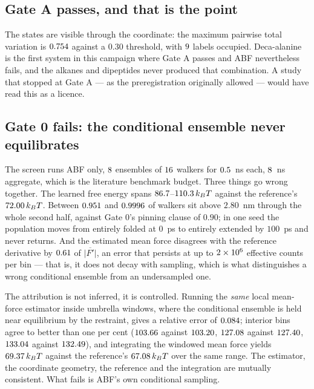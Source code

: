 \subsection{Gate A passes, and that is the point}

The states are visible through the coordinate: the maximum pairwise total variation is
$0.754$ against a $0.30$ threshold, with $9$ labels occupied. Deca-alanine is
the first system in this campaign where Gate A passes and ABF nevertheless fails, and the alkanes
and dipeptides never produced that combination. A study that stopped at Gate A --- as the
preregistration originally allowed --- would have read this as a licence.

\subsection{Gate 0 fails: the conditional ensemble never equilibrates}

The screen runs ABF only, $8$ ensembles of $16$ walkers for
$0.5$~ns each, $8$~ns aggregate, which is the literature benchmark budget.
Three things go wrong together. The learned free energy spans
$86.7$--$110.3\,k_BT$ against the reference's $72.00\,k_BT$. Between
$0.951$ and $0.9996$ of walkers sit above $2.80$~nm through the whole second half, against
Gate 0's pinning clause of $0.90$; in one seed the population moves from entirely folded at
$0$~ps to entirely extended by $100$~ps and never returns. And the estimated mean force disagrees
with the reference derivative by $0.61$ of $\overline{|F'|}$, an error that persists at up
to $2\times10^{6}$ effective counts per bin --- that is, it does not decay with sampling,
which is what distinguishes a wrong conditional ensemble from an undersampled one.

The attribution is not inferred, it is controlled. Running the \emph{same} local mean-force
estimator inside umbrella windows, where the conditional ensemble is held near equilibrium by the
restraint, gives a relative error of $0.084$; interior bins agree to better than one per
cent ($103.66$ against $103.20$, $127.08$ against $127.40$,
$133.04$ against $132.49$), and integrating the windowed mean force yields
$69.37\,k_BT$ against the reference's $67.08\,k_BT$ over the same range.
The estimator, the coordinate geometry, the reference and the integration are mutually
consistent. What fails is ABF's own conditional sampling.

